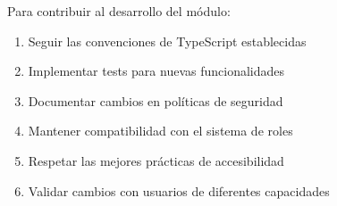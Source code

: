 \documentclass[12pt,a4paper]{article}
\begin{document}
Para contribuir al desarrollo del módulo:
\begin{enumerate}
    \item Seguir las convenciones de TypeScript establecidas
    \item Implementar tests para nuevas funcionalidades
    \item Documentar cambios en políticas de seguridad
    \item Mantener compatibilidad con el sistema de roles
    \item Respetar las mejores prácticas de accesibilidad
    \item Validar cambios con usuarios de diferentes capacidades
\end{enumerate}
\end{document}
